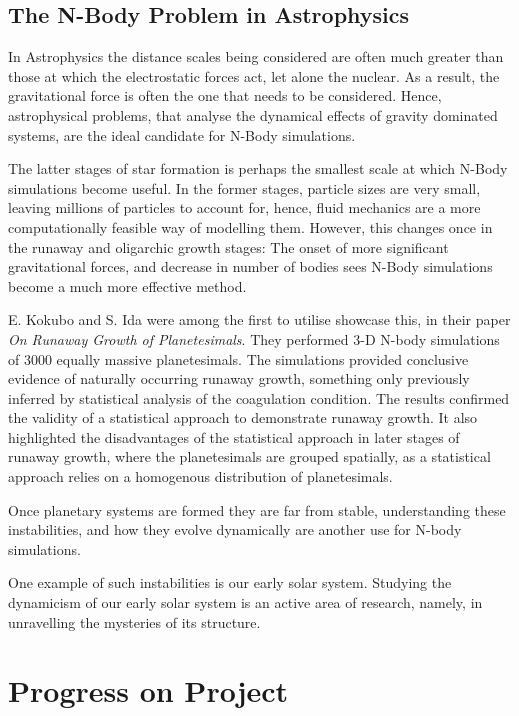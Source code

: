 \documentclass[a4paper,10pt]{article}
\begin{document}
\subsection{The N-Body Problem in Astrophysics}

In Astrophysics the distance scales being considered are often much greater than those at which the electrostatic forces act, let alone the nuclear. As a result, the gravitational force is often the one that needs to be considered. Hence, astrophysical problems, that analyse the dynamical effects of gravity dominated systems, are the ideal candidate for N-Body simulations.

The latter stages of star formation is perhaps the smallest scale at which N-Body simulations become useful. In the former stages, particle sizes are very small, leaving millions of particles to account for, hence, fluid mechanics are a more computationally feasible way of modelling them. However, this changes once in the runaway and oligarchic growth stages: The onset of more significant gravitational forces, and decrease in number of bodies sees N-Body simulations become a much more effective method. 

E. Kokubo and S. Ida were among the first to utilise showcase this, in their paper \textit{On Runaway Growth of Planetesimals}\cite{Runaway}. They performed 3-D N-body simulations of 3000 equally massive planetesimals. The simulations provided conclusive evidence of naturally occurring runaway growth, something only previously inferred by statistical analysis of the coagulation condition\cite{Statistics,Coagulation}. The results confirmed the validity of a statistical approach to demonstrate runaway growth. It also highlighted the disadvantages of the statistical approach in later stages of runaway growth, where the planetesimals are grouped spatially, as a statistical approach relies on a homogenous distribution of planetesimals.

Once planetary systems are formed they are far from stable, understanding these instabilities, and how they evolve dynamically are another use for N-body simulations. 

One example of such instabilities is our early solar system. Studying the dynamicism of our early solar system is an active area of research, namely, in unravelling the mysteries of its structure.


\section{Progress on Project}
\end{document}
